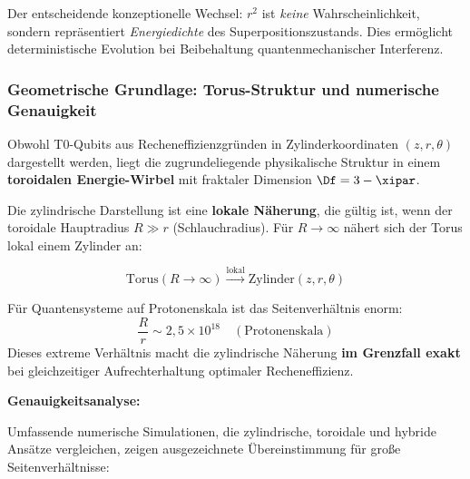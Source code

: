 \begin{remark}
	Der entscheidende konzeptionelle Wechsel: $r^2$ ist \emph{keine} Wahrscheinlichkeit, sondern repräsentiert \emph{Energiedichte} des Superpositionszustands. Dies ermöglicht deterministische Evolution bei Beibehaltung quantenmechanischer Interferenz.
\end{remark}

\subsubsection{Geometrische Grundlage: Torus-Struktur und numerische Genauigkeit}
\label{sec:torus_geometry_corrected}

Obwohl T0-Qubits aus Recheneffizienzgründen in Zylinderkoordinaten $(z,r,\theta)$ 
dargestellt werden, liegt die zugrundeliegende physikalische Struktur in einem 
\textbf{toroidalen Energie-Wirbel} mit fraktaler Dimension $\Df = 3 - \xipar$.

Die zylindrische Darstellung ist eine \textbf{lokale Näherung}, die gültig ist, 
wenn der toroidale Hauptradius $R \gg r$ (Schlauchradius). Für $R \to \infty$ 
nähert sich der Torus lokal einem Zylinder an:

\[
\text{Torus}(R \to \infty) \xrightarrow{\text{lokal}} \text{Zylinder}(z,r,\theta)
\]

Für Quantensysteme auf Protonenskala ist das Seitenverhältnis enorm:
\[
\frac{R}{r} \sim 2,\!5 \times 10^{18} \quad (\text{Protonenskala})
\]
Dieses extreme Verhältnis macht die zylindrische Näherung \textbf{im Grenzfall exakt} 
bei gleichzeitiger Aufrechterhaltung optimaler Recheneffizienz.

\textbf{Genauigkeitsanalyse:}

Umfassende numerische Simulationen, die zylindrische, toroidale und hybride 
Ansätze vergleichen, zeigen ausgezeichnete Übereinstimmung für große Seitenverhältnisse:

\begin{table}[h]
	\centering
	\caption{Vergleich des CHSH-Parameters: 73-Qubit-System}
	\label{tab:chsh_methods_comparison}
\end{table}

